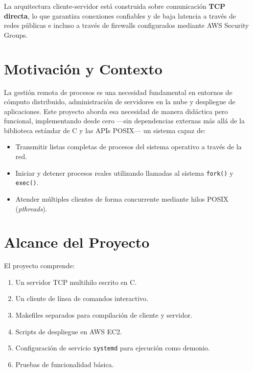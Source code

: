 \documentclass[12pt,a4paper]{report}
\begin{document}
La arquitectura cliente-servidor está construida sobre comunicación \textbf{TCP directa}, lo que garantiza conexiones confiables y de baja latencia a través de redes públicas e incluso a través de firewalls configurados mediante AWS Security Groups.

\section{Motivación y Contexto}

La gestión remota de procesos es una necesidad fundamental en entornos de cómputo distribuido, administración de servidores en la nube y despliegue de aplicaciones. Este proyecto aborda esa necesidad de manera didáctica pero funcional, implementando desde cero —sin dependencias externas más allá de la biblioteca estándar de C y las APIs POSIX— un sistema capaz de:

\begin{itemize}[leftmargin=1.5em]
  \item Transmitir listas completas de procesos del sistema operativo a través de la red.
  \item Iniciar y detener procesos reales utilizando llamadas al sistema \texttt{fork()} y \texttt{exec()}.
  \item Atender múltiples clientes de forma concurrente mediante hilos POSIX (\textit{pthreads}).
\end{itemize}

\section{Alcance del Proyecto}

El proyecto comprende:

\begin{enumerate}[leftmargin=1.5em]
  \item Un servidor TCP multihilo escrito en C.
  \item Un cliente de línea de comandos interactivo.
  \item Makefiles separados para compilación de cliente y servidor.
  \item Scripts de despliegue en AWS EC2.
  \item Configuración de servicio \texttt{systemd} para ejecución como demonio.
  \item Pruebas de funcionalidad básica.
\end{enumerate}

\end{document}
